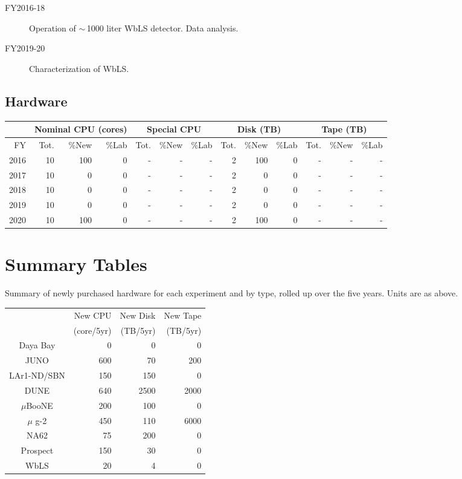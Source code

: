 \documentclass[pdftex,12pt,letter]{article}
\begin{document}
\begin{description}

\item[FY2016-18] Operation of $\sim$\,1000 liter WbLS detector. Data analysis.
                \item [FY2019-20] Characterization of WbLS. 
\end{description}

\subsection{Hardware}

\begin{tabular}[h]{|r || r|r|r || r|r|r || r|r|r || r|r|r ||}
  \hline
   & \multicolumn{3}{c||}{Nominal CPU (cores)} & \multicolumn{3}{c||}{Special CPU} & \multicolumn{3}{c||}{Disk (TB)} & \multicolumn{3}{c||}{Tape (TB)} \\
   \hline
  FY & Tot. & \%New & \%Lab & Tot. & \%New & \%Lab & Tot. & \%New & \%Lab & Tot. & \%New & \%Lab \\
  \hline
  2016 & 10 & 100& 0&- &- &- & 2& 100 & 0&- &- &- \\
  \hline
  2017 & 10&    0& 0&- &- &- & 2& 0& 0&- &- &-  \\
  \hline
  2018 & 10&    0& 0&- &- &- & 2& 0& 0&- &- &-  \\
  \hline
  2019 & 10&    0& 0&- &- &- & 2& 0& 0&- &- &-  \\
  \hline
  2020 & 10&  100& 0&- &- &- & 2& 100& 0&- &- &-  \\
  \hline
\end{tabular}

%

\pagebreak
\section{Summary Tables}

Summary of newly purchased hardware for each experiment and by type,
rolled up over the five years.
Units are as above.

\begin{center}
  
\begin{tabular}[h]{|c||r|r|r|}
\hline
    & New CPU    & New Disk & New Tape \\
    & (core/5yr) & (TB/5yr) & (TB/5yr) \\
\hline
Daya Bay & 0 & 0 & 0 \\
\hline
JUNO & 600 & 70 & 200 \\
\hline
LAr1-ND/SBN & 150 & 150 & 0 \\
\hline
DUNE & 640 & 2500 & 2000 \\
\hline
$\mu$BooNE & 200 & 100 & 0 \\
\hline
$\mu$ g-2 & 450 & 110 & 6000 \\
\hline
NA62 & 75 & 200 & 0 \\
\hline
Prospect & 150 & 30 & 0 \\
\hline
WbLS & 20 & 4 & 0 \\
\hline
\end{tabular}

\end{center}
\end{document}

